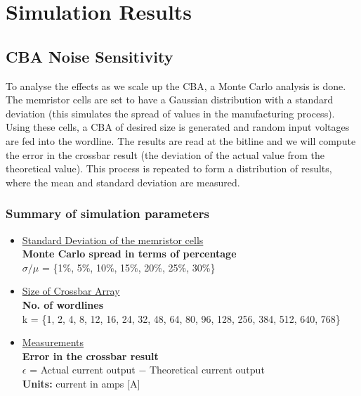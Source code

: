 
\chapter{Simulation Results}
\label{appendix:simulation_results}

\vspace{2em}

\section{\ac{CBA} Noise Sensitivity}
\label{appendix:simulation_results:cba_ns}

\noindent
To analyse the effects as we scale up the \ac{CBA}, a Monte Carlo analysis is done.
The memristor cells are set to have a Gaussian distribution with a standard deviation (this simulates the spread of values in the manufacturing process).
Using these cells, a \ac{CBA} of desired size is generated and random input voltages are fed into the wordline.
The results are read at the bitline and we will compute the error in the crossbar result (the deviation of the actual value from the theoretical value). This process is repeated to form a distribution of results, where the mean and standard deviation are measured.

\subsection{Summary of simulation parameters}

\begin{itemize}
    \item \underline{Standard Deviation of the memristor cells}\\
        \textbf{Monte Carlo spread in terms of percentage} \\
            ${\sigma / \mu}$ = \{1\%,  5\%, 10\%, 15\%, 20\%, 25\%, 30\%\}
    \item \underline{Size of Crossbar Array} \\
        \textbf{No. of wordlines} \\
        k = \{1, 2, 4, 8, 12, 16, 24, 32, 48, 64, 80, 96, 128, 256, 384, 512, 640, 768\}
    \item \underline{Measurements} \\
        \textbf{Error in the crossbar result} \\
        $\epsilon$ = Actual current output $-$ Theoretical current output \\
        \textbf{Units:} {current in amps [A]}
\end{itemize}

